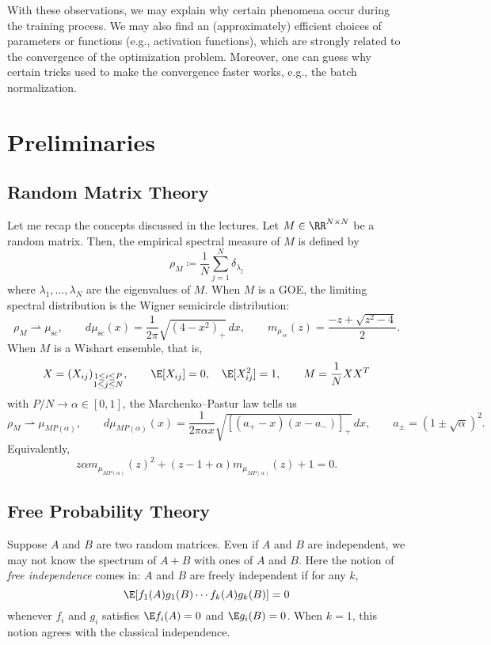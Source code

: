 \documentclass[notitlepage]{report}
\begin{document}
With these observations, we may explain why certain phenomena occur during the training process. We may also find an (approximately) efficient choices of parameters or functions (e.g., activation functions), which are strongly related to the convergence of the optimization problem. Moreover, one can guess why certain tricks used to make the convergence faster works, e.g., the batch normalization.


\section{Preliminaries}

\subsection{Random Matrix Theory}

Let me recap the concepts discussed in the lectures. Let $M\in \RR^{N\times N}$ be a random matrix. Then, the empirical spectral measure of $M$ is defined by
\[ \rho_M \coloneqq \frac 1 N \sum_{j=1}^N \delta_{\lambda_j} \]
where $\lambda_1,\dots,\lambda_N$ are the eigenvalues of $M$. When $M$ is a GOE, the limiting spectral distribution is the Wigner semicircle distribution:
\[ \rho_M \rightharpoonup \mu_\text{sc},\qquad d\mu_{\text{sc}}(x) = \frac 1{2\pi }\sqrt{(4 -x^2)_+}\,dx, \qquad m_{\mu_{sc}}(z) = \frac{-z+\sqrt{z^2-4}}2. \]
When $M$ is a Wishart ensemble, that is,
\[ X = (X_{ij})_{\substack{1\le i\le P \\ 1\le j\le N}},\qquad \E[X_{ij}]=0,\quad \E[X_{ij}^2]=1,\qquad M = \frac 1N XX^T\]
with $P/N\to \alpha\in [0,1]$, the Marchenko--Pastur law tells us
\[ \rho_M \rightharpoonup \mu_{MP(\alpha)},\qquad d\mu_{MP(\alpha)}(x) = \frac1{2\pi\alpha x} \sqrt{[(a_+-x)(x-a_-)]_+}\,dx,\qquad a_{\pm} = (1\pm \sqrt \alpha)^2. \]
Equivalently,
\[ z\alpha m_{\mu_{MP(\alpha)}}(z)^2 + (z-1+\alpha)m_{\mu_{MP(\alpha)}}(z) + 1=0. \]

\subsection{Free Probability Theory}

Suppose $A$ and $B$ are two random matrices. Even if $A$ and $B$ are independent, we may not know the spectrum of $A+B$ with ones of $A$ and $B$. Here the notion of \emph{free independence} comes in: $A$ and $B$ are freely independent if for any $k$,
\[ \E[f_1(A)g_1(B)\cdots f_k(A)g_k(B)] = 0 \]
whenever $f_i$ and $g_i$ satisfies $\E f_i(A) = 0$ and $\E g_i(B) = 0$. When $k=1$, this notion agrees with the classical independence.
\end{document}

